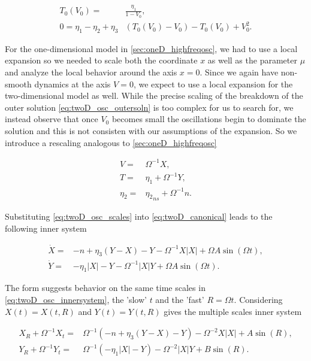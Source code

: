 \begin{equation*} \label{eq:twoD_lowerleadingorder}
\begin{aligned}
T_0(V_0)=&\frac{\eta_1}{1-V_0},\\
0=\eta_1-\eta_2+\eta_3&(T_0(V_0)-V_0)-T_0(V_0)+V_0^2.
\end{aligned}
\end{equation*}

For the one-dimensional model in \autoref{sec:oneD_highfreqosc}, we had to use a local expansion so we needed to scale both the coordinate $x$ as well as the parameter $\mu$ and analyze the local behavior around the axis $x=0$. Since we again have non-smooth dynamics at the axis $V=0$, we expect to use a local expansion for the two-dimensional model as well. While the precise scaling of the breakdown of the outer solution \eqref{eq:twoD_osc_outersoln} is too complex for us to search for, we instead observe that once $V_0$ becomes small the oscillations begin to dominate the solution and this is not consisten with our assumptions of the expansion. So we introduce a rescaling analogous to \autoref{sec:oneD_highfreqosc}

\begin{equation}\label{eq:twoD_osc_scales}
\begin{aligned}
V=&\Omega^{-1}X,\\
T=& \eta_1 +\Omega^{-1}Y,\\
\eta_2=&{\eta_2}_{ns}+\Omega^{-1} n.
\end{aligned}
\end{equation}

Substituting \eqref{eq:twoD_osc_scales} into \eqref{eq:twoD_canonical} leads to the following inner system

\begin{equation}\label{eq:twoD_osc_innersystem}
\begin{aligned}
\dot{X}=& -n+\eta_3(Y-X)-Y-\Omega^{-1}X|X| +\Omega A\sin(\Omega t),\\
\dot{Y}=& -\eta_1|X|-Y -\Omega^{-1}|X|Y +\Omega A \sin(\Omega t).
\end{aligned}
\end{equation}

The form suggests behavior on the same time scales in \eqref{eq:twoD_osc_innersystem}, the 'slow' $t$ and the 'fast' $R=\Omega t$. Considering $X(t)=X(t,R)$ and $Y(t)=Y(t,R)$ gives the multiple scales inner system

\begin{equation}\label{eq:twoD_osc_innermulti}
\begin{aligned}
X_R+\Omega^{-1}X_t =& \Omega^{-1}\left(-n +\eta_3(Y-X)-Y\right)-\Omega^{-2}X|X|+A\sin(R),\\
Y_R+\Omega^{-1}Y_t =& \Omega^{-1}\left(-\eta_1|X|-Y\right)-\Omega^{-2}|X|Y+ B\sin(R).
\end{aligned}
\end{equation}

